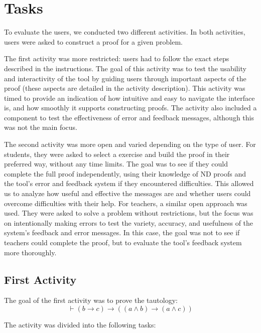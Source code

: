 \section{Tasks}
To evaluate the users, we conducted two different activities. In both activities, users were asked to construct a proof for a given problem.

The first activity was more restricted: users had to follow the exact steps described in the instructions. The goal of this activity was to test the usability and interactivity of the tool by guiding users through important aspects of the proof (these aspects are detailed in the activity description). This activity was timed to provide an indication of how intuitive and easy to navigate the interface is, and how smoothly it supports constructing proofs. The activity also included a component to test the effectiveness of error and feedback messages, although this was not the main focus.

The second activity was more open and varied depending on the type of user. For students, they were asked to select a exercise and build the proof in their preferred way, without any time limits. The goal was to see if they could complete the full proof independently, using their knowledge of \gls{ND} proofs and the tool’s error and feedback system if they encountered difficulties. This allowed us to analyze how useful and effective the messages are and whether users could overcome difficulties with their help. For teachers, a similar open approach was used. They were asked to solve a problem without restrictions, but the focus was on intentionally making errors to test the variety, accuracy, and usefulness of the system’s feedback and error messages. In this case, the goal was not to see if teachers could complete the proof, but to evaluate the tool’s feedback system more thoroughly.

\subsection*{First Activity}
The goal of the first activity was to prove the tautology:
\[
\vdash (b \rightarrow c) \rightarrow ((a \wedge b) \rightarrow (a \wedge c))
\]

The activity was divided into the following tasks:

